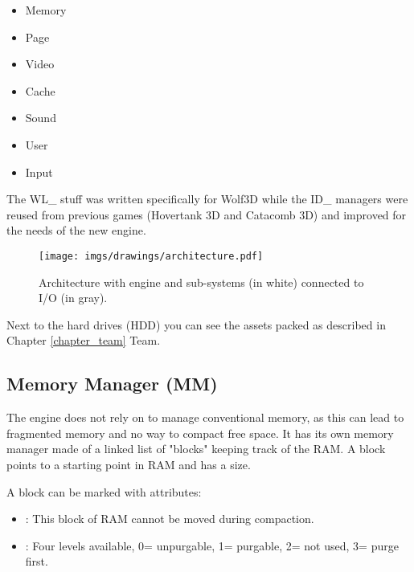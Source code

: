\documentclass[book.tex]{subfiles}
\begin{document}
\begin{itemize}
	\item Memory
	\item Page
	\item Video
	\item Cache
	\item Sound
	\item User
	\item Input
\end{itemize}
\par
The WL\_ stuff was written specifically for Wolf3D while the ID\_ managers were reused from previous games (Hovertank 3D and Catacomb 3D) and improved for the needs of the new engine.

\begin{figure}[H]
\centering
\texttt{[image: imgs/drawings/architecture.pdf]}
\caption{Architecture with engine and sub-systems (in white) connected to I/O (in gray).}
\label{fig:architecture}
\end{figure}
Next to the hard drives (HDD) you can see the assets packed as described in Chapter \ref{chapter_team} Team.










\subsection{Memory Manager (MM)}
The engine does not rely on  to manage conventional memory, as this can lead to fragmented memory and no way to compact free space. It has its own memory manager made of a linked list of "blocks" keeping track of the RAM. A block points to a starting point in RAM and has a size.\\
 \par

 \par
A block can be marked with attributes:
\begin{itemize}
\item {} : This block of RAM cannot be moved during compaction.
\item {} : Four levels available, 0= unpurgable, 1= purgable, 2= not used, 3= purge first.
\end{itemize}
\end{document}
